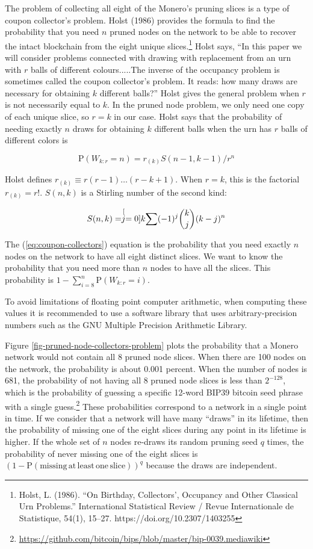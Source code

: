 \documentclass[english]{article}
\begin{document}
The problem of collecting all eight of the Monero's pruning slices
is a type of coupon collector's problem. Holst (1986) provides the
formula to find the probability that you need $n$ pruned nodes on
the network to be able to recover the intact blockchain from the eight
unique slices.\footnote{Holst, L. (1986). ``On Birthday, Collectors\textquoteright , Occupancy
and Other Classical Urn Problems.'' International Statistical Review
/ Revue Internationale de Statistique, 54(1), 15--27. https://doi.org/10.2307/1403255} Holst says, ``In this paper we will consider problems connected
with drawing with replacement from an urn with $r$ balls of different
colours.....The inverse of the occupancy problem is sometimes called
the coupon collector's problem. It reads: how many draws are necessary
for obtaining $k$ different balls?'' Holst gives the general problem
when $r$ is not necessarily equal to $k$. In the pruned node problem,
we only need one copy of each unique slice, so $r=k$ in our case.
Holst says that the probability of needing exactly $n$ draws for
obtaining $k$ different balls when the urn has $r$ balls of different
colors is

\begin{equation}
\mathrm{P}\left(W_{k:r}=n\right)=r_{(k)}S(n-1,k-1)/r^{n}\label{eq:coupon-collectors}
\end{equation}

Holst defines $r_{(k)}\equiv r(r-1)\ldots(r-k+1)$. When $r=k$, this
is the factorial $r_{(k)}=r!$. $S(n,k)$ is a Stirling number of
the second kind: 

\[
S(n,k)=\stackrel[j=0]{k}{\sum}(-1)^{j}\dbinom{k}{j}(k-j)^{n}
\]

The (\ref{eq:coupon-collectors}) equation is the probability that
you need exactly $n$ nodes on the network to have all eight distinct
slices. We want to know the probability that you need more than $n$
nodes to have all the slices. This probability is $1-\sum_{i=8}^{n}\mathrm{P}\left(W_{k:r}=i\right)$.

To avoid limitations of floating point computer arithmetic, when computing
these values it is recommended to use a software library that uses
arbitrary-precision numbers such as the GNU Multiple Precision Arithmetic
Library.

Figure \ref{fig-pruned-node-collectors-problem} plots the probability
that a Monero network would not contain all 8 pruned node slices.
When there are 100 nodes on the network, the probability is about
0.001 percent. When the number of nodes is 681, the probability of
not having all 8 pruned node slices is less than $2^{-128}$, which
is the probability of guessing a specific 12-word BIP39 bitcoin seed
phrase with a single guess.\footnote{\url{https://github.com/bitcoin/bips/blob/master/bip-0039.mediawiki}}
These probabilities correspond to a network in a single point in time.
If we consider that a network will have many ``draws'' in its lifetime,
then the probability of missing one of the eight slices during any
point in its lifetime is higher. If the whole set of $n$ nodes re-draws
its random pruning seed $q$ times, the probability of never missing
one of the eight slices is $\left(1-\mathrm{P}\left(\mathrm{missing\,at\,least\,one\,slice}\right)\right)^{q}$
because the draws are independent.
\end{document}
